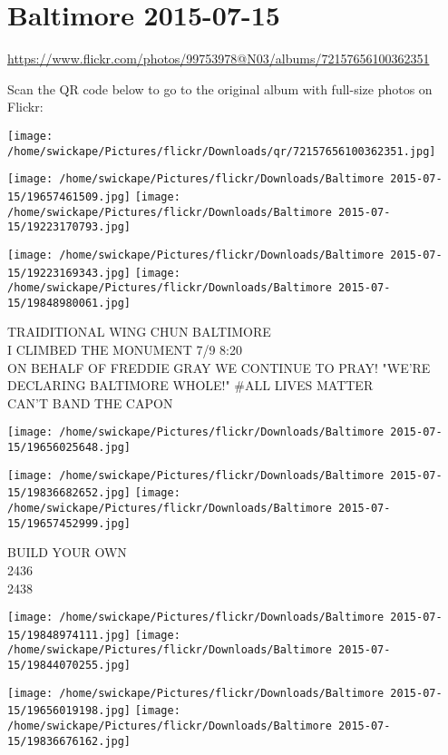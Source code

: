 \documentclass[10pt,letterpaper]{article}
\title{}
\author{}
\date{}
\begin{document}
\section*{Baltimore 2015-07-15}

\url{https://www.flickr.com/photos/99753978@N03/albums/72157656100362351}

Scan the QR code below to go to the original album with full-size photos on Flickr:

\texttt{[image: /home/swickape/Pictures/flickr/Downloads/qr/72157656100362351.jpg]}
\pagebreak

\texttt{[image: /home/swickape/Pictures/flickr/Downloads/Baltimore 2015-07-15/19657461509.jpg]}
\texttt{[image: /home/swickape/Pictures/flickr/Downloads/Baltimore 2015-07-15/19223170793.jpg]}

\texttt{[image: /home/swickape/Pictures/flickr/Downloads/Baltimore 2015-07-15/19223169343.jpg]}
\texttt{[image: /home/swickape/Pictures/flickr/Downloads/Baltimore 2015-07-15/19848980061.jpg]}

TRAIDITIONAL WING CHUN BALTIMORE\\
I CLIMBED THE MONUMENT 7/9 8:20\\
ON BEHALF OF FREDDIE GRAY WE CONTINUE TO PRAY!  "WE'RE DECLARING BALTIMORE WHOLE!"  \#ALL LIVES MATTER\\
CAN'T BAND THE CAPON
\pagebreak

\texttt{[image: /home/swickape/Pictures/flickr/Downloads/Baltimore 2015-07-15/19656025648.jpg]}

\vspace{0.25in}
\texttt{[image: /home/swickape/Pictures/flickr/Downloads/Baltimore 2015-07-15/19836682652.jpg]}
\texttt{[image: /home/swickape/Pictures/flickr/Downloads/Baltimore 2015-07-15/19657452999.jpg]}

BUILD YOUR OWN\\
2436\\
2438
\pagebreak

\texttt{[image: /home/swickape/Pictures/flickr/Downloads/Baltimore 2015-07-15/19848974111.jpg]}
\texttt{[image: /home/swickape/Pictures/flickr/Downloads/Baltimore 2015-07-15/19844070255.jpg]}

\texttt{[image: /home/swickape/Pictures/flickr/Downloads/Baltimore 2015-07-15/19656019198.jpg]}
\texttt{[image: /home/swickape/Pictures/flickr/Downloads/Baltimore 2015-07-15/19836676162.jpg]}
\end{document}

